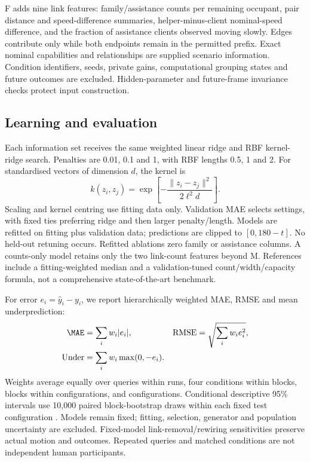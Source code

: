 F adds nine link features: family/assistance counts per remaining occupant, pair distance and speed-difference summaries, helper-minus-client nominal-speed difference, and the fraction of assistance clients observed moving slowly. Edges contribute only while both endpoints remain in the permitted prefix. Exact nominal capabilities and relationships are supplied scenario information. Condition identifiers, seeds, private gains, computational grouping states and future outcomes are excluded. Hidden-parameter and future-frame invariance checks protect input construction.

\subsection{Learning and evaluation}
Each information set receives the same weighted linear ridge and RBF kernel-ridge search. Penalties are 0.01, 0.1 and 1, with RBF lengths 0.5, 1 and 2. For standardised vectors of dimension $d$, the kernel is
\begin{equation}
k(z_i,z_j)=\exp\!\left[-\frac{\|z_i-z_j\|^2}{2\ell^2d}\right].
\end{equation}
Scaling and kernel centring use fitting data only. Validation MAE selects settings, with fixed ties preferring ridge and then larger penalty/length. Models are refitted on fitting plus validation data; predictions are clipped to $[0,180-t]$. No held-out retuning occurs. Refitted ablations zero family or assistance columns. A counts-only model retains only the two link-count features beyond M. References include a fitting-weighted median and a validation-tuned count/width/capacity formula, not a comprehensive state-of-the-art benchmark.

For error $e_i=\hat y_i-y_i$, we report hierarchically weighted MAE, RMSE and mean underprediction:
\begin{align}
\MAE&=\sum_iw_i|e_i|, &
\operatorname{RMSE}&=\sqrt{\sum_iw_ie_i^2},\\
\operatorname{Under}&=\sum_iw_i\max(0,-e_i).
\end{align}
Weights average equally over queries within runs, four conditions within blocks, blocks within configurations, and configurations. Conditional descriptive 95\% intervals use 10,000 paired block-bootstrap draws within each fixed test configuration \cite{r6}. Models remain fixed; fitting, selection, generator and population uncertainty are excluded. Fixed-model link-removal/rewiring sensitivities preserve actual motion and outcomes. Repeated queries and matched conditions are not independent human participants.


